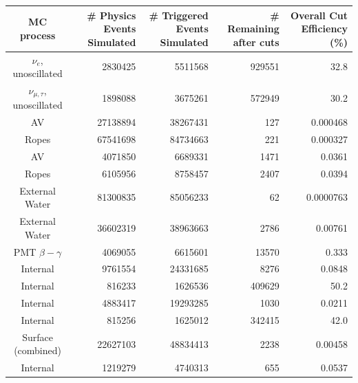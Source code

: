 \begin{table}
    \begin{center}
        \begin{tabulary}{\textwidth}{c R R R R}
            \hline
            MC process       & \# Physics Events Simulated & \# Triggered Events Simulated  & \# Remaining after cuts & Overall Cut Efficiency (\%) \\ \hline \hline
            \beight{} $\nu_{e}$, unoscillated & \num{2830425}  & \num{5511568}  & \num{929551} & 32.8     \\
            \beight{} $\nu_{\mu,\tau}$, unoscillated & \num{1898088} & \num{3675261} & \num{572949} & 30.2\\
            \hline
            AV     & \num{27138894} & \num{38267431} & \num{127}    & 0.000468 \\
            Ropes  & \num{67541698} & \num{84734663} & \num{221}    & 0.000327 \\
            AV     & \num{4071850}  & \num{6689331}  & \num{1471}   & 0.0361    \\
            Ropes  & \num{6105956}  & \num{8758457}  & \num{2407}   & 0.0394   \\
            External Water  & \num{81300835} & \num{85056233} & \num{62} & 0.0000763 \\
            External Water  & \num{36602319} & \num{38963663} & \num{2786} & 0.00761 \\
            PMT $\beta-\gamma$  & \num{4069055}  & \num{6615601}  & \num{13570}  & 0.333    \\
            \hline
            Internal  & \num{9761554} & \num{24331685} & \num{8276} & 0.0848  \\
            Internal  & \num{816233} & \num{1626536} & \num{409629} & 50.2     \\
            Internal  & \num{4883417} & \num{19293285} & \num{1030} & 0.0211 \\
            Internal  & \num{815256} & \num{1625012} & \num{342415} & 42.0     \\ \hline
            Surface \alphan{} (combined) & \num{22627103} & \num{48834413} & \num{2238} & 0.00458 \\
            Internal \alphan{} & \num{1219279} & \num{4740313} & \num{655} & 0.0537 \\

\end{tabulary}
\end{center}
\end{table}
